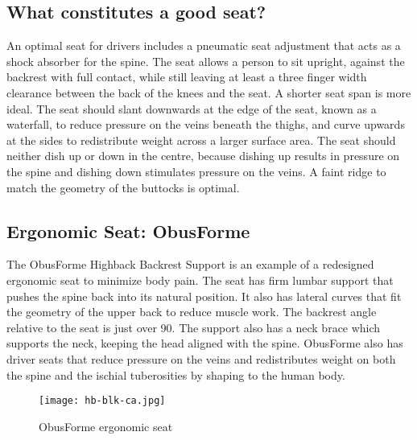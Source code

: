 \documentclass[11pt]{article}
\begin{document}
\subsection{What constitutes a good seat?}
An optimal seat for drivers includes a pneumatic seat adjustment that acts as a shock absorber for the spine. The seat 
allows a person to sit upright, against the backrest with full contact, while still leaving at least a 
three finger width clearance between the back of the knees and the seat. A shorter seat span is more ideal. 
The seat should slant downwards at the edge of the seat, known as a waterfall, to reduce pressure on the veins 
beneath the thighs, and curve upwards at the sides to redistribute weight across a larger surface area. 
The seat should neither dish 
up or down in the centre, because dishing up results in pressure on the spine and dishing down stimulates pressure on the veins. 
A faint ridge to match the geometry of the buttocks is optimal\cite{ergoCentricchair2011, Natpost2005}.


\subsection{Ergonomic Seat: ObusForme}
The ObusForme Highback Backrest Support is an example of a redesigned ergonomic seat to minimize body pain. 
The seat has firm lumbar support that pushes the spine back into its natural position. 
It also has lateral curves that fit the geometry of the upper back to reduce muscle work\cite{ObusFormebackrest}. 
The backrest angle relative to the seat is just over 90\textdegree. The support also has a neck brace which supports
the neck, keeping the head aligned with the spine\cite{ObusFormedriverchair}.
ObusForme also has driver seats that reduce pressure on the veins and redistributes weight 
on both the spine and the ischial tuberosities by shaping to the human body\cite{ObusFormecushion}.
\begin{figure}[h]
  \centering
  \texttt{[image: hb-blk-ca.jpg]}
  \caption{ObusForme ergonomic seat}
\end{figure}
\end{document}
